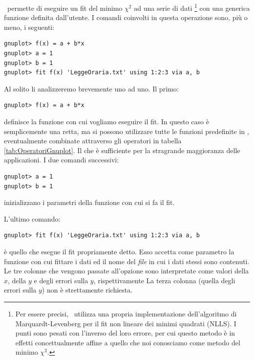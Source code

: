 \gnuplot\ permette di eseguire un fit del minimo $\chi^2$ ad una serie di dati%
\footnote{
Per essere precisi, \gnuplot\ utilizza una propria implementazione
dell'algoritmo di Marquardt-Levenberg per il fit non lineare dei minimi
quadrati (NLLS). I punti sono pesati con l'inverso del loro errore, per cui
questo metodo \`e in effetti concettualmente affine a quello che noi
conosciamo come metodo del minimo $\chi^2$.
}
con una generica funzione definita dall'utente. I comandi coinvolti in questa
operazione sono, pi\`u o meno, i seguenti:
\begin{verbatim}
gnuplot> f(x) = a + b*x
gnuplot> a = 1
gnuplot> b = 1
gnuplot> fit f(x) 'LeggeOraria.txt' using 1:2:3 via a, b 
\end{verbatim}
Al solito li analizzeremo brevemente uno ad uno. Il primo:
\begin{verbatim}
gnuplot> f(x) = a + b*x
\end{verbatim}
definisce la funzione con cui vogliamo eseguire il fit. In questo caso \`e
semplicemente una retta, ma si possono utilizzare tutte le funzioni predefinite
in \gnuplot, eventualmente combinate attraverso gli operatori in tabella
\ref{tab:OperatoriGnuplot}. Il che \`e sufficiente per la stragrande
maggioranza delle applicazioni.
I due comandi successivi:
\begin{verbatim}
gnuplot> a = 1
gnuplot> b = 1
\end{verbatim}
inizializzano i parametri della funzione con cui si fa il fit.


\noindent L'ultimo comando:
\begin{verbatim}
gnuplot> fit f(x) 'LeggeOraria.txt' using 1:2:3 via a, b
\end{verbatim}
\`e quello che esegue il fit propriamente detto. Esso accetta come parametro la
funzione con cui fittare i dati ed il nome del \emph{file} in cui i dati
stessi sono contenuti.
Le tre colonne che vengono passate all'opzione  sono interpretate
come valori della $x$, della $y$ e degli errori sulla $y$, rispettivamente
La terza colonna (quella degli errori sulla $y$) non \`e strettamente
richiesta.

